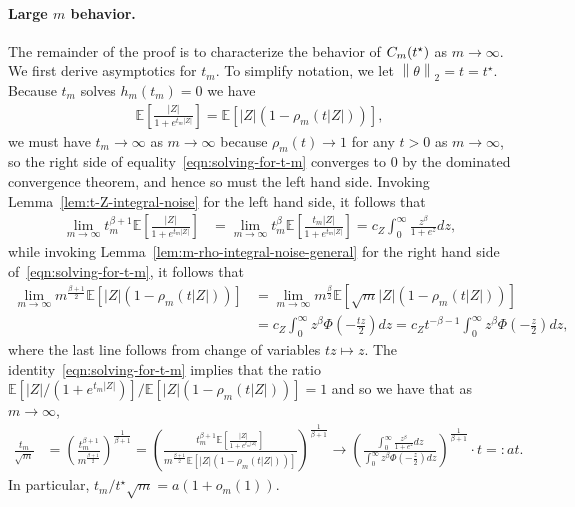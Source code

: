 \documentclass[11pt]{article}
\newcommand{\Ep}{\mathbb{E}}
\newcommand{\brk}[1]{\left[{#1}\right]} %
\newcommand{\norm}[1]{\left\|{#1}\right\|} %
\newcommand{\ltwo}[1]{\norm{#1}_2} %
\newcommand{\<}{\langle} %
\renewcommand{\>}{\rangle}
\newcommand{\opt}{^\star}
\begin{document}
\paragraph{Large $m$ behavior.} The remainder of the
proof is to characterize the behavior of $\varfunc(t\opt)$ as $m\to\infty$.
We first derive asymptotics for $t_m$. To simplify notation, we let
$\ltwo{\theta} = t = t\opt$. Because $t_m$ solves $h_m(t_m) = 0$ we have
\begin{align}
  \Ep \brk{\frac{|Z|}{1 + e^{t_m|Z|}}} = \Ep \brk{|Z|(1-\rho_m(t |Z|))},
  \label{eqn:solving-for-t-m}
\end{align}
we must have $t_m \to \infty$ as $m \to \infty$ because $\rho_m(t) \to 1$
for any $t > 0$ as $m \to \infty$, so the right side of
equality~\eqref{eqn:solving-for-t-m} converges to 0 by the dominated
convergence theorem, and hence so must the left hand side.  Invoking
Lemma~\ref{lem:t-Z-integral-noise} for the left hand side, it follows that
\begin{align*}
  \lim_{m \to \infty} t_m^{\beta + 1} \Ep \brk{\frac{|Z|}{1 + e^{t_m|Z|}}} & = \lim_{m \to \infty} t_m^{\beta} \Ep \brk{\frac{t_m|Z|}{1 + e^{t_m|Z|}}}  =  c_Z \int_{0}^{\infty} \frac{z^\beta}{1 + e^{z}} dz, %
\end{align*}
while invoking Lemma~\ref{lem:m-rho-integral-noise-general} for the right
hand side of~\eqref{eqn:solving-for-t-m}, it follows that
\begin{align*}
  \lim_{m \to \infty} m^{\frac{\beta+1}{2}}\Ep \brk{|Z|(1-\rho_m(t  |Z|))} & = \lim_{m \to \infty} m^{\frac{\beta}{2}} \Ep \brk{\sqrt m|Z|(1-\rho_m(t  |Z|))} \nonumber \\
  &  = c_Z \int_0^\infty z^\beta \Phi \left(-\frac{tz}{2}\right) dz = c_Z {t}^{-\beta-1}\int_0^\infty z^\beta \Phi \left(-\frac{z}{2}\right) dz, %
\end{align*}
where the last line follows from change of variables $tz \mapsto z$. The
identity~\eqref{eqn:solving-for-t-m}
implies that the ratio $\Ep [|Z|/(1 + e^{t_m|Z|})] / \Ep [|Z|(1-\rho_m(t
  |Z|))] = 1$ and so we have that as $m \to \infty$,
\begin{align*}
		\frac{t_m}{\sqrt{m}} & = \left(\frac{	t_m^{\beta + 1}}{ m^{\frac{\beta+1}{2}}}\right)^{\frac{1}{\beta +1}} =  \left(\frac{	t_m^{\beta + 1}\Ep \brk{\frac{|Z|}{1 + e^{t_m|Z|}}}}{ m^{\frac{\beta+1}{2}} \Ep \brk{|Z|(1-\rho_m(t |Z|))} }\right)^{\frac{1}{\beta +1}}  \to  \left(\frac{\int_{0}^{\infty} \frac{z^\beta}{1 + e^{z}} dz}{\int_0^\infty z^\beta \Phi \left(-\frac{z}{2}\right) dz}\right)^{\frac{1}{\beta +1}} \cdot t= : a t .  \label{eq:Cm-asymp-noise-tm}
\end{align*}
In particular, $t_m / t\opt \sqrt{m} = a(1 + o_m(1))$.
\end{document}
